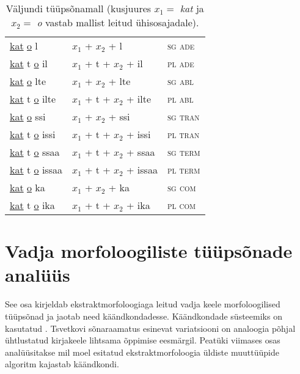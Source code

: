 \documentclass[12pt,a4paper]{article}
\begin{document}
\begin{table}[H]
\begin{minipage}[t]{.55\textwidth}
\begin{tabular}[t]{l l l}
      \underline{kat}   \underline{o} l     & $x_1$ + $x_2$ + l         & \textsc{sg ade} \\
      \underline{kat} t \underline{o} il    & $x_1$ + t + $x_2$ + il    & \textsc{pl ade} \\
      \underline{kat}   \underline{o} lte   & $x_1$ + $x_2$ + lte       & \textsc{sg abl} \\
      \underline{kat} t \underline{o} ilte  & $x_1$ + t + $x_2$ + ilte  & \textsc{pl abl} \\
      \underline{kat}   \underline{o} ssi   & $x_1$ + $x_2$ + ssi       & \textsc{sg tran} \\
      \underline{kat} t \underline{o} issi  & $x_1$ + t + $x_2$ + issi  & \textsc{pl tran} \\
      \underline{kat} t \underline{o} ssaa  & $x_1$ + t + $x_2$ + ssaa  & \textsc{sg term} \\
      \underline{kat} t \underline{o} issaa & $x_1$ + t + $x_2$ + issaa & \textsc{pl term} \\
      \underline{kat}   \underline{o} ka    & $x_1$ + $x_2$ + ka        & \textsc{sg com} \\
      \underline{kat} t \underline{o} ika   & $x_1$ + t + $x_2$ + ika   & \textsc{pl com} \\
    \end{tabular}
    \caption{Väljundi tüüpsõnamall (kus\-juures $x_1 = $ \textit{kat} ja $x_2 = $ \textit{o} vastab mallist leitud ühisosajadale).}
    \label{tab:väljundtabel_katto}
  \end{minipage}
\end{table}








\newpage
\section{Vadja morfoloogiliste tüüpsõnade analüüs}
\label{sec:analüüs}

See osa kirjeldab ekstraktmorfoloogiaga leitud vadja keele morfoloogilised tüüpsõnad ja jaotab need käändkondadesse. Käändkondade süsteemiks on kasutatud \cite{ariste_grammar_1968}. Tsvetkovi sõnaraamatus esinevat variatsiooni on analoogia põhjal ühtlustatud kirjakeele lihtsama õppimise eesmärgil. Peatüki viimases osas analüüsitakse mil moel \cite{silfverberg_computational_2018} esitatud ekstraktmorfoloogia üldiste muuttüüpide algoritm kajastab käändkondi.
\end{document}
